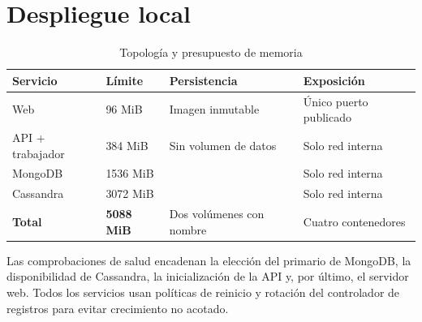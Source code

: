 \section{Despliegue local}

\begin{table}[H]
  \centering
  \caption{Topología y presupuesto de memoria}
  \label{tab:memoria}
  \begin{tabularx}{\textwidth}{@{}p{2.8cm}p{2.3cm}YY@{}}
    \toprule
    \textbf{Servicio} & \textbf{Límite} & \textbf{Persistencia} & \textbf{Exposición} \\
    \midrule
    Web & 96 MiB & Imagen inmutable & Único puerto publicado \\
    API + trabajador & 384 MiB & Sin volumen de datos & Solo red interna \\
    MongoDB & 1536 MiB &  & Solo red interna \\
    Cassandra & 3072 MiB &  & Solo red interna \\
    \midrule
    \textbf{Total} & \textbf{5088 MiB} & Dos volúmenes con nombre & Cuatro contenedores \\
    \bottomrule
  \end{tabularx}
\end{table}

Las comprobaciones de salud encadenan la elección del primario de MongoDB, la disponibilidad de Cassandra, la inicialización de la API y, por último, el servidor web. Todos los servicios usan políticas de reinicio y rotación del controlador de registros para evitar crecimiento no acotado.
